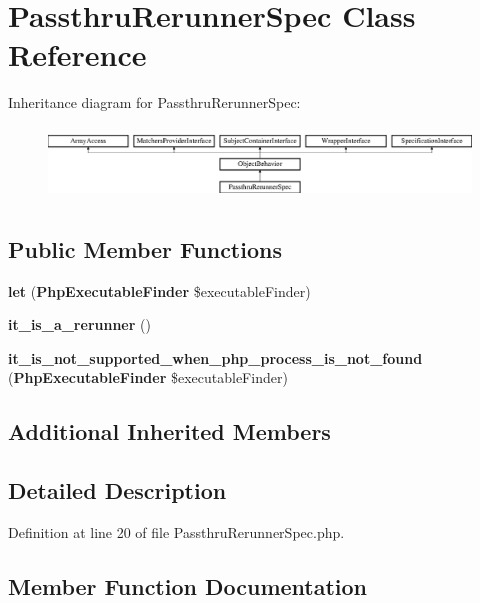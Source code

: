 \section{Passthru\+Rerunner\+Spec Class Reference}
\label{classspec_1_1_php_spec_1_1_process_1_1_re_runner_1_1_passthru_rerunner_spec}
Inheritance diagram for Passthru\+Rerunner\+Spec\+:\begin{figure}[H]
\begin{center}
\leavevmode
\includegraphics[height=1.953488cm]{classspec_1_1_php_spec_1_1_process_1_1_re_runner_1_1_passthru_rerunner_spec}
\end{center}
\end{figure}
\subsection*{Public Member Functions}
\begin{DoxyCompactItemize}
\item 
{\bf let} ({\bf Php\+Executable\+Finder} \$executable\+Finder)
\item 
{\bf it\+\_\+is\+\_\+a\+\_\+rerunner} ()
\item 
{\bf it\+\_\+is\+\_\+not\+\_\+supported\+\_\+when\+\_\+php\+\_\+process\+\_\+is\+\_\+not\+\_\+found} ({\bf Php\+Executable\+Finder} \$executable\+Finder)
\end{DoxyCompactItemize}
\subsection*{Additional Inherited Members}


\subsection{Detailed Description}


Definition at line 20 of file Passthru\+Rerunner\+Spec.\+php.



\subsection{Member Function Documentation}

